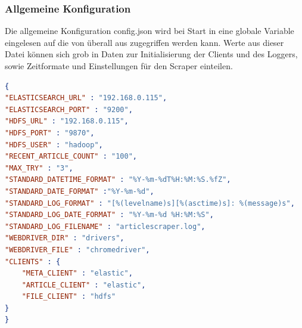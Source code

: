 \documentclass[12pt,oneside,a4paper,parskip]{scrbook}
\begin{document}
\subsubsection{Allgemeine Konfiguration}
Die allgemeine Konfiguration config.json wird bei Start in eine globale Variable eingelesen auf die von überall aus zugegriffen werden kann. Werte aus dieser Datei können sich grob in Daten zur Initialisierung der Clients und des Loggers, sowie Zeitformate und Einstellungen für den Scraper einteilen.
\begin{lstlisting}[caption=config.json,label=config,language=json]
{
"ELASTICSEARCH_URL" : "192.168.0.115",
"ELASTICSEARCH_PORT" : "9200",
"HDFS_URL" : "192.168.0.115",
"HDFS_PORT" : "9870",
"HDFS_USER" : "hadoop",
"RECENT_ARTICLE_COUNT" : "100",
"MAX_TRY" : "3",
"STANDARD_DATETIME_FORMAT" : "%Y-%m-%dT%H:%M:%S.%fZ",
"STANDARD_DATE_FORMAT" :"%Y-%m-%d",
"STANDARD_LOG_FORMAT" : "[%(levelname)s][%(asctime)s]: %(message)s",
"STANDARD_LOG_DATE_FORMAT" : "%Y-%m-%d %H:%M:%S",
"STANDARD_LOG_FILENAME" : "articlescraper.log",
"WEBDRIVER_DIR" : "drivers",
"WEBDRIVER_FILE" : "chromedriver",
"CLIENTS" : {
    "META_CLIENT" : "elastic",
    "ARTICLE_CLIENT" : "elastic",
    "FILE_CLIENT" : "hdfs"
}
}
\end{lstlisting}
\end{document}
